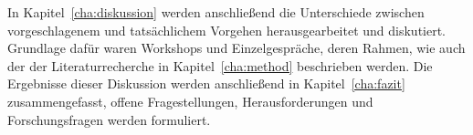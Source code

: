 In Kapitel~\ref{cha:diskussion} werden anschließend die Unterschiede zwischen
vorgeschlagenem und tatsächlichem Vorgehen herausgearbeitet und diskutiert. Grundlage dafür waren Workshops und Einzelgespräche, deren Rahmen, wie auch der der Literaturrecherche in Kapitel~\ref{cha:method} beschrieben werden. Die Ergebnisse dieser Diskussion werden anschließend in Kapitel~\ref{cha:fazit}
zusammengefasst, offene Fragestellungen, Herausforderungen und Forschungsfragen werden
formuliert.
\begin{comment}


Lösungen
haben ganz allgemein zwei Vorteile für Unternehmen, die am für Salesforce
typischen Beispiel einer Kundenverwaltung schildern möchte. Möchte ein
Unternehmen Informationen zu seinen Kunden zentral speichern, muss es bei einer
Cloudlösung keinen Server installieren und warten. Es kann also Kosten für
Hardware sowie mindestens noch Personalkosten bei der Administration einsparen.
Der erste Vorteil entsteht also durch Kosteneinsparungen auf Serverseite des
Unternehmens. Cloudbasierte Software lässt sich regelmäßig mit einem Browser
bedienen, der auf allen mobilen und internetfähigen Geräten wie auf
herkömmlichen Computern verfügbar sein dürfte. Im Beispiel muss der Anwender,
der Zugriff auf die Kundendaten nehmen will, keine Software installieren und
ist an kein Gerät gebunden.\\
Die Idee hinter dem Migrationsprojekt ist die Verbindung der Expertise beider
Unternehmen: Die Nutzung des aufgebauten Know-Hows auf einer neuen,
zukunftsfähigen Plattform. \\
Dabei stellen sich die folgenden Fragen:
\begin{itemize}
	\item Welche Strategie sollte künftig mit dem bestehenden Produkt
verfolgt werden?
	\item In welchem Umfang soll die Cloud Software durch
	\begin{itemize}
		\item den Anbieter
		\item den Kunden
	\end{itemize}
	anpassbar sein?
	\item Wie lassen sich idealerweise die Anforderungen ermitteln?
	\item Welche Funktionen sollen übernommen werden?
	\item Wie lässt sich ein bestehendes Produkt an die neuen Möglichkeiten
der Cloud anpassen?
\end{itemize}

Im folgenden gebe ich einen Überblick über Methoden des
Requirements-Engineering.
\end{comment}
